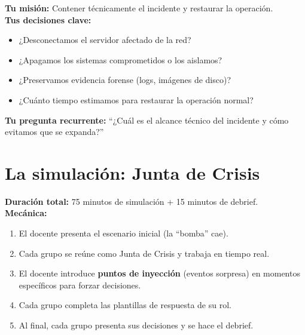 \documentclass[12pt,a4paper]{article}
\begin{document}
\vspace{6pt}

\begin{cajaRolTI}
\textbf{Tu misi\'on:} Contener t\'ecnicamente el incidente y restaurar la operaci\'on.\\[4pt]
\textbf{Tus decisiones clave:}
\begin{itemize}[leftmargin=1.5em]
    \item ¿Desconectamos el servidor afectado de la red?
    \item ¿Apagamos los sistemas comprometidos o los aislamos?
    \item ¿Preservamos evidencia forense (logs, im\'agenes de disco)?
    \item ¿Cu\'anto tiempo estimamos para restaurar la operaci\'on normal?
\end{itemize}
\textbf{Tu pregunta recurrente:} ``¿Cu\'al es el alcance t\'ecnico del incidente y c\'omo evitamos que se expanda?''
\end{cajaRolTI}

\newpage
\section{La simulaci\'on: Junta de Crisis}

\begin{cajaCrisis}[title={Instrucciones de la simulaci\'on}]
\textbf{Duraci\'on total:} 75 minutos de simulaci\'on + 15 minutos de debrief.\\[4pt]
\textbf{Mec\'anica:}
\begin{enumerate}[leftmargin=2em]
    \item El docente presenta el escenario inicial (la ``bomba'' cae).
    \item Cada grupo se re\'une como Junta de Crisis y trabaja en tiempo real.
    \item El docente introduce \textbf{puntos de inyecci\'on} (eventos sorpresa) en momentos espec\'ificos para forzar decisiones.
    \item Cada grupo completa las plantillas de respuesta de su rol.
    \item Al final, cada grupo presenta sus decisiones y se hace el debrief.
\end{enumerate}
\end{cajaCrisis}
\end{document}
